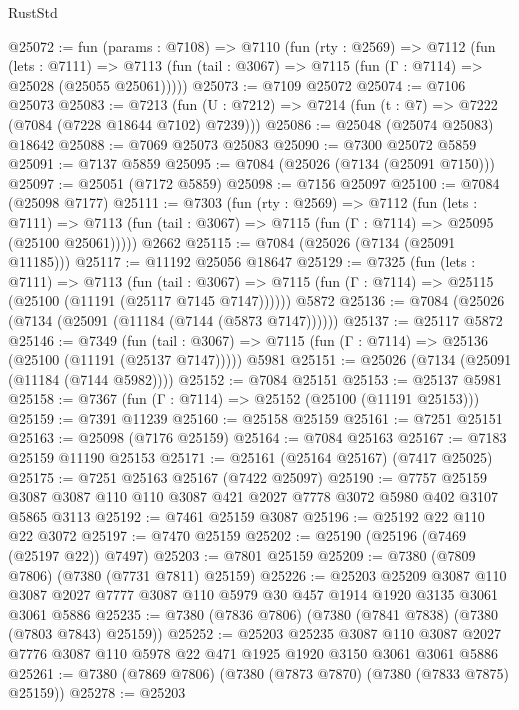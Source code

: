 \begin{lexlean}{RustStd}
\begin{coremodule}
@25072 := fun (params : @7108) =>
  @7110
    (fun (rty : @2569) =>
    @7112
      (fun (lets : @7111) =>
      @7113 (fun (tail : @3067) => @7115 (fun (Γ : @7114) => @25028 (@25055 @25061)))))
@25073 := @7109 @25072
@25074 := @7106 @25073
@25083 := @7213
    (fun (U : @7212) => @7214 (fun (t : @7) => @7222 (@7084 (@7228 @18644 @7102) @7239)))
@25086 := @25048 (@25074 @25083) @18642
@25088 := @7069 @25073 @25083
@25090 := @7300 @25072 @5859
@25091 := @7137 @5859
@25095 := @7084 (@25026 (@7134 (@25091 @7150)))
@25097 := @25051 (@7172 @5859)
@25098 := @7156 @25097
@25100 := @7084 (@25098 @7177)
@25111 := @7303
    (fun (rty : @2569) =>
    @7112
      (fun (lets : @7111) =>
      @7113 (fun (tail : @3067) => @7115 (fun (Γ : @7114) => @25095 (@25100 @25061)))))
    @2662
@25115 := @7084 (@25026 (@7134 (@25091 @11185)))
@25117 := @11192 @25056 @18647
@25129 := @7325
    (fun (lets : @7111) =>
    @7113
      (fun (tail : @3067) =>
      @7115 (fun (Γ : @7114) => @25115 (@25100 (@11191 (@25117 @7145 @7147))))))
    @5872
@25136 := @7084 (@25026 (@7134 (@25091 (@11184 (@7144 (@5873 @7147))))))
@25137 := @25117 @5872
@25146 := @7349
    (fun (tail : @3067) => @7115 (fun (Γ : @7114) => @25136 (@25100 (@11191 (@25137 @7147)))))
    @5981
@25151 := @25026 (@7134 (@25091 (@11184 (@7144 @5982))))
@25152 := @7084 @25151
@25153 := @25137 @5981
@25158 := @7367 (fun (Γ : @7114) => @25152 (@25100 (@11191 @25153)))
@25159 := @7391 @11239
@25160 := @25158 @25159
@25161 := @7251 @25151
@25163 := @25098 (@7176 @25159)
@25164 := @7084 @25163
@25167 := @7183 @25159 @11190 @25153
@25171 := @25161 (@25164 @25167) (@7417 @25025)
@25175 := @7251 @25163 @25167 (@7422 @25097)
@25190 := @7757
    @25159
    @3087
    @3087
    @110
    @110
    @3087
    @421
    @2027
    @7778
    @3072
    @5980
    @402
    @3107
    @5865
    @3113
@25192 := @7461 @25159 @3087
@25196 := @25192 @22 @110 @22 @3072
@25197 := @7470 @25159
@25202 := @25190 (@25196 (@7469 (@25197 @22)) @7497)
@25203 := @7801 @25159
@25209 := @7380 (@7809 @7806) (@7380 (@7731 @7811) @25159)
@25226 := @25203
    @25209
    @3087
    @110
    @3087
    @2027
    @7777
    @3087
    @110
    @5979
    @30
    @457
    @1914
    @1920
    @3135
    @3061
    @3061
    @5886
@25235 := @7380 (@7836 @7806) (@7380 (@7841 @7838) (@7380 (@7803 @7843) @25159))
@25252 := @25203
    @25235
    @3087
    @110
    @3087
    @2027
    @7776
    @3087
    @110
    @5978
    @22
    @471
    @1925
    @1920
    @3150
    @3061
    @3061
    @5886
@25261 := @7380 (@7869 @7806) (@7380 (@7873 @7870) (@7380 (@7833 @7875) @25159))
@25278 := @25203

\end{coremodule}
\end{lexlean}
